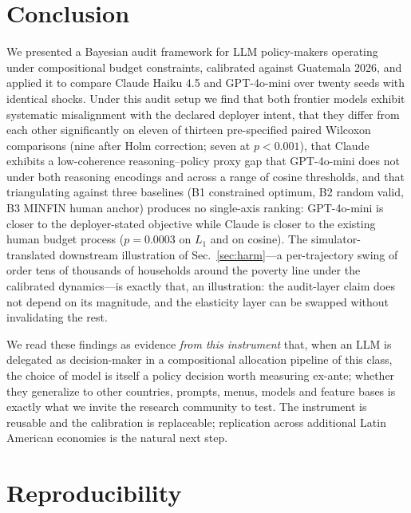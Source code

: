\documentclass[conference]{IEEEtran}
\begin{document}
\section{Conclusion}

We presented a Bayesian audit framework for LLM policy-makers
operating under compositional budget constraints, calibrated against
Guatemala 2026, and applied it to compare Claude Haiku 4.5 and
GPT-4o-mini over twenty seeds with identical shocks. Under this
audit setup we find that both frontier models exhibit systematic
misalignment with the declared deployer intent, that they differ
from each other significantly on eleven of thirteen pre-specified
paired Wilcoxon comparisons (nine after Holm correction; seven at
$p<0.001$), that Claude exhibits a low-coherence reasoning--policy
proxy gap that GPT-4o-mini does not under both reasoning encodings
and across a range of cosine thresholds, and that triangulating
against three baselines (B1 constrained optimum, B2 random valid,
B3 MINFIN human anchor) produces no single-axis ranking: GPT-4o-mini
is closer to the deployer-stated objective while Claude is closer
to the existing human budget process ($p{=}0.0003$ on $L_1$ and on
cosine). The
simulator-translated downstream illustration of
Sec.~\ref{sec:harm}---a per-trajectory swing of order tens of
thousands of households around the poverty line under the calibrated
dynamics---is exactly that, an illustration: the audit-layer claim
does not depend on its magnitude, and the elasticity layer can be
swapped without invalidating the rest.

We read these findings as evidence \emph{from this instrument} that,
when an LLM is delegated as decision-maker in a compositional
allocation pipeline of this class, the choice of model is itself a
policy decision worth measuring ex-ante; whether they generalize to
other countries, prompts, menus, models and feature bases is exactly
what we invite the research community to test. The instrument is
reusable and the calibration is replaceable; replication across
additional Latin American economies is the natural next step.

\appendix
\section{Reproducibility}
\label{app:repro}
\end{document}

